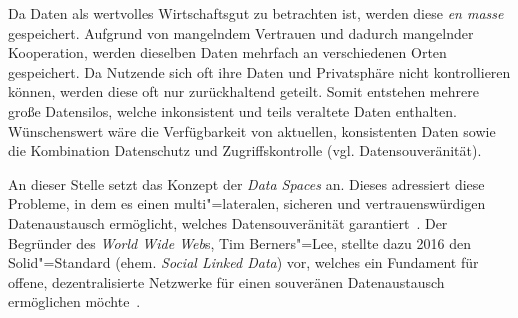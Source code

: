 Da Daten als wertvolles Wirtschaftsgut zu betrachten ist, werden diese \emph{en masse} gespeichert.
Aufgrund von mangelndem Vertrauen und dadurch mangelnder Kooperation, werden dieselben Daten mehrfach an verschiedenen Orten gespeichert.
Da Nutzende sich oft ihre Daten und Privatsphäre nicht kontrollieren können, werden diese oft nur zurückhaltend geteilt.
Somit entstehen mehrere große Datensilos, welche inkonsistent und teils veraltete Daten enthalten.
Wünschenswert wäre die Verfügbarkeit von aktuellen, konsistenten Daten sowie die Kombination Datenschutz und Zugriffskontrolle (vgl. Datensouveränität).

An dieser Stelle setzt das Konzept der \emph{Data Spaces} an. Dieses adressiert diese Probleme, in dem es einen multi"=lateralen, sicheren und vertrauenswürdigen Datenaustausch ermöglicht, welches Datensouveränität garantiert~\cite{mollerIndustrialDataEcosystems2024}.
Der Begründer des \emph{World Wide Web}s, Tim Berners"=Lee, stellte dazu 2016 den Solid"=Standard (ehem. \emph{Social Linked Data}) vor, welches ein Fundament für offene, dezentralisierte Netzwerke für einen souveränen Datenaustausch ermöglichen möchte~\cite{mecklerWebLinkedData2023}.
